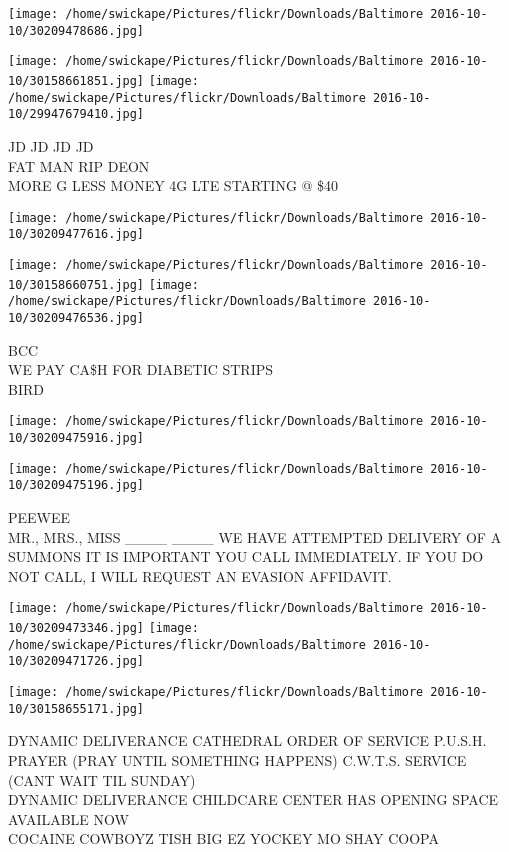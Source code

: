 \documentclass[10pt,letterpaper]{article}
\begin{document}
\texttt{[image: /home/swickape/Pictures/flickr/Downloads/Baltimore 2016-10-10/30209478686.jpg]}

\vspace{0.25in}
\texttt{[image: /home/swickape/Pictures/flickr/Downloads/Baltimore 2016-10-10/30158661851.jpg]}
\texttt{[image: /home/swickape/Pictures/flickr/Downloads/Baltimore 2016-10-10/29947679410.jpg]}

JD JD JD JD\\
FAT MAN RIP DEON\\
MORE G LESS MONEY 4G LTE STARTING @ \$40
\pagebreak

\texttt{[image: /home/swickape/Pictures/flickr/Downloads/Baltimore 2016-10-10/30209477616.jpg]}

\vspace{0.25in}
\texttt{[image: /home/swickape/Pictures/flickr/Downloads/Baltimore 2016-10-10/30158660751.jpg]}
\texttt{[image: /home/swickape/Pictures/flickr/Downloads/Baltimore 2016-10-10/30209476536.jpg]}

BCC\\
WE PAY CA\$H FOR DIABETIC STRIPS\\
BIRD
\pagebreak

\texttt{[image: /home/swickape/Pictures/flickr/Downloads/Baltimore 2016-10-10/30209475916.jpg]}

\vspace{0.25in}
\texttt{[image: /home/swickape/Pictures/flickr/Downloads/Baltimore 2016-10-10/30209475196.jpg]}

PEEWEE\\
MR., MRS., MISS \_\_\_\_ \_\_\_\_ WE HAVE ATTEMPTED DELIVERY OF A SUMMONS IT IS IMPORTANT YOU CALL IMMEDIATELY.  IF YOU DO NOT CALL, I WILL REQUEST AN EVASION AFFIDAVIT.
\pagebreak

\texttt{[image: /home/swickape/Pictures/flickr/Downloads/Baltimore 2016-10-10/30209473346.jpg]}
\texttt{[image: /home/swickape/Pictures/flickr/Downloads/Baltimore 2016-10-10/30209471726.jpg]}

\vspace{0.25in}
\texttt{[image: /home/swickape/Pictures/flickr/Downloads/Baltimore 2016-10-10/30158655171.jpg]}

DYNAMIC DELIVERANCE CATHEDRAL ORDER OF SERVICE P.U.S.H. PRAYER (PRAY UNTIL SOMETHING HAPPENS) C.W.T.S. SERVICE (CANT WAIT TIL SUNDAY)\\
DYNAMIC DELIVERANCE CHILDCARE CENTER HAS OPENING  SPACE AVAILABLE NOW\\
COCAINE COWBOYZ TISH BIG EZ YOCKEY MO SHAY COOPA
\pagebreak
\end{document}
